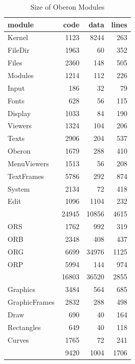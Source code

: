 \begin{table}[p]
  \centering
  \begin{tabular}{l r r r}
    module        & code  & data  & lines \\\hline
    Kernel        &  1123 &  8244 &  263  \\
    FileDir       &  1963 &    60 &  352  \\
    Files         &  2360 &   148 &  505  \\
    Modules       &  1214 &   112 &  226  \\
    Input         &   186 &    32 &   79  \\ 
    Fonts         &   628 &    56 &  115  \\
    Display       &  1033 &    84 &  190  \\
    Viewers       &  1324 &   104 &  206  \\
    Texts         &  2906 &   204 &  537  \\
    Oberon        &  1679 &   288 &  410  \\
    MenuViewers   &  1513 &    56 &  208  \\  
    TextFrames    &  5786 &   292 &  874  \\
    System        &  2134 &    72 &  418  \\
    Edit          &  1096 &  1104 &  232  \\\hline
                  & 24945 & 10856 & 4615  \\ [1ex]
    ORS           &  1762 &   992 &  319  \\
    ORB           &  2348 &   408 &  437  \\
    ORG           &  6699 & 34976 & 1125  \\
    ORP           &  5994 &   144 &  974  \\\hline
                  & 16803 & 36520 & 2855  \\ [1ex]
    Graphics      &  3484 &   564 &  685  \\
    GraphicFrames &  2832 &   288 &  498  \\
    Draw          &   690 &    40 &  164  \\
    Rectangles    &   649 &    40 &  118  \\
    Curves        &  1765 &    72 &  241  \\\hline
                  &  9420 &  1004 & 1706  \\
  \end{tabular}
  \caption{Size of Oberon Modules}
  \label{tbl:modsiz}
\end{table}

